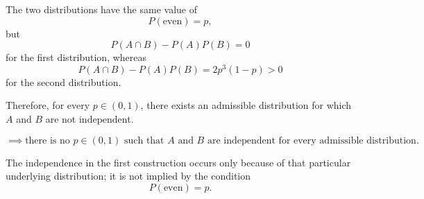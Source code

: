 \documentclass[12pt]{article}
\begin{document}
The two distributions have the same value of
\[
P(\text{even})=p,
\]
but
\[
P(A\cap B)-P(A)P(B)
=
0
\]
for the first distribution, whereas
\[
P(A\cap B)-P(A)P(B)
=
2p^3(1-p)>0
\]
for the second distribution.

Therefore, for every \(p\in(0,1)\), there exists an admissible distribution for which \(A\) and \(B\) are not independent.

\[
\implies
\text{there is no }p\in(0,1)
\text{ such that }A\text{ and }B
\text{ are independent for every admissible distribution}.
\]

The independence in the first construction occurs only because of that particular underlying distribution; it is not implied by the condition
\[
P(\text{even})=p.
\]
\end{document}

